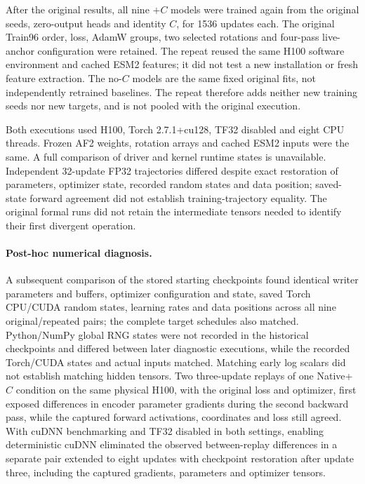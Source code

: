 After the original results, all nine $+C$ models were trained again from the
original seeds, zero-output heads and identity $C$, for 1536 updates each.
The original Train96 order, loss, AdamW groups, two selected rotations and
four-pass live-anchor configuration were retained. The repeat reused the same
H100 software environment and cached ESM2 features; it did not test a new
installation or fresh feature extraction. The no-$C$ models are the
same fixed original fits, not independently retrained baselines. The repeat
therefore adds neither new training seeds nor new targets, and is not pooled
with the original execution.

Both executions used H100, Torch 2.7.1+cu128, TF32 disabled and eight CPU
threads. Frozen AF2 weights, rotation arrays and cached ESM2 inputs were the
same. A full comparison of driver and kernel runtime states is unavailable.
Independent 32-update FP32 trajectories differed despite exact restoration
of parameters, optimizer state, recorded random states and data position;
saved-state forward agreement did not establish training-trajectory equality.
The original formal runs did not retain the intermediate tensors needed to
identify their first divergent operation.

\paragraph{Post-hoc numerical diagnosis.}
A subsequent comparison of the stored starting checkpoints found identical
writer parameters and buffers, optimizer configuration and state, saved
Torch CPU/CUDA random states, learning rates and data positions across all
nine original/repeated pairs; the complete target schedules also matched.
Python/NumPy global RNG states were not recorded in the historical checkpoints
and differed between later diagnostic executions, while the recorded
Torch/CUDA states and actual inputs matched. Matching early log scalars did
not establish matching hidden tensors.
Two three-update replays of one Native+$C$ condition on the same
physical H100, with the original loss and optimizer, first exposed differences
in encoder parameter gradients during the second backward pass, while the captured forward activations,
coordinates and loss still agreed. With cuDNN benchmarking and TF32 disabled
in both settings, enabling deterministic cuDNN eliminated the observed
between-replay differences in a separate pair extended to eight updates
with checkpoint restoration after update three, including the captured
gradients, parameters and optimizer tensors.

